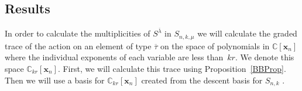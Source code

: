 \documentclass[10pt]{article}
\begin{document}
\subsection{Results}

	In order to calculate the multiplicities of $S^{\overline{\lambda}}$ in $S_{n,k,\mu}$ we will calculate the graded trace 
of the action on an element of type $\overline{\tau}$ on the space of polynomials in $\mathbb{C}[\mathbf{x}_n]$ where the 
individual exponents of each variable are less than~$kr$. We denote this space $\mathbb{C}_{kr}[\mathbf{x}_n]$. First, 
we will calculate this trace using Proposition~\ref{BBProp}. Then we will use a basis for 
$\mathbb{C}_{kr}[\mathbf{x}_n]$ created from the descent basis for $S_{n,k}$ .
\end{document}
